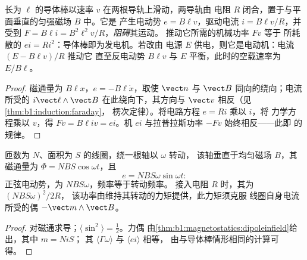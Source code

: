 \begin{proposition}[滑动导体棒]\label{prop:b1:induction:rails}
长为 $\ell$ 的导体棒以速率 $v$ 在两根导轨上滑动，两导轨由
电阻 $R$ 闭合，置于与平面垂直的匀强磁场 $B$ 中。它是
产生电动势 $e = B\ell v$，驱动电流 $i = B\ell v/R$，并受到
 $F = B\ell i = B^2\ell^2v/R$，\emph{阻碍}其运动。
推动它所需的机械功率 $Fv$ 等于
所耗散的 $ei = Ri^2$：导体棒即为发电机。若改由
电源 $E$ 供电，则它是电动机：电流 $(E - B\ell v)/R$ 推动它
直至反电动势 $B\ell v$ 与 $E$ 平衡，此时的空载速率为 $E/B\ell$。
\end{proposition}

\begin{proof}
磁通量为 $B\ell x$，$e = -B\ell\dot x$，取使 $\vect n$
与 $\vect B$ 同向的绕向；电流所受的 $i\vect\ell\wedge\vect B$
在此绕向下，其方向与 $\vect v$ 相反（见\cref{thm:b1:induction:faraday}，
楞次定律）。将电路方程 $e = Ri$ 乘以 $i$，将
力学方程乘以 $v$，得 $Fv = B\ell iv = ei$。机 $ei$ 与拉普拉斯功率 $-Fv$ 始终相反——此即
的规律。
\end{proof}

\begin{proposition}\label{prop:b1:induction:alternator}
匝数为 $N$、面积为 $S$ 的线圈，绕一根轴以 $\omega$ 转动，
该轴垂直于均匀磁场 $B$，其磁通量为 $\Phi = NBS\cos\omega t$，且
\[
e = NBS\omega\sin\omega t :
\]
正弦电动势，为 $NBS\omega$，频率等于转动频率。
接入电阻 $R$ 时，其为 $(NBS\omega)^2/2R$，
该功率由维持其转动的力矩提供，此力矩须克服
线圈自身电流所受的偶 $-\vect m\wedge\vect B$。
\end{proposition}

\begin{proof}
对磁通求导；$\langle\sin^2\rangle = \tfrac12$。力偶
由\cref{thm:b1:magnetostatics:dipoleinfield}给出，其中 $m = Ni S$；
其 $\langle\Gamma\omega\rangle$ 与 $\langle ei\rangle$ 相等，
由与导体棒情形相同的计算可得。
\end{proof}

